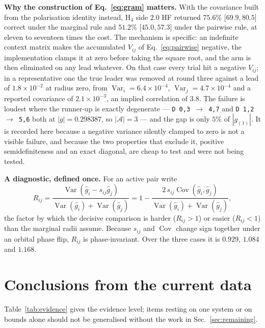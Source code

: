 \documentclass[10pt]{article}
\newcommand{\Var}{\operatorname{Var}}
\newcommand{\Cov}{\operatorname{Cov}}
\begin{document}
\textbf{Why the construction of Eq.~\eqref{eq:gram} matters.} With the covariance
built from the polarisation identity instead, H$_4$ side $2.0$ HF returned
$75.6\%$ [$69.9,80.5$] correct under the marginal rule and $51.2\%$ [$45.0,57.3$]
under the pairwise rule, at eleven to seventeen times the cost. The mechanism is
specific: an indefinite context matrix makes the accumulated $V_{ij}$ of
Eq.~\eqref{eq:pairwise} negative, the implementation clamps it at zero before
taking the square root, and the arm is then eliminated on any lead whatever. On
that case every trial hit a negative $V_{ij}$; in a representative one the true
leader was removed at round three against a lead of $1.8\times10^{-2}$ at radius
zero, from $\Var_i=6.4\times10^{-4}$, $\Var_j=4.7\times10^{-4}$ and a reported
covariance of $2.1\times10^{-3}$, an implied correlation of $3.8$. The failure is
loudest where the runner-up is exactly degenerate --- \texttt{D 0,3 $\to$ 4,7} and
\texttt{D 1,2 $\to$ 5,6} both at $|g|=0.298387$, so $|\mathcal A|=3$ --- and the
gap is only $5\%$ of $|g_{(1)}|$. It is recorded here because a negative variance
silently clamped to zero is not a visible failure, and because the two properties
that exclude it, positive semidefiniteness and an exact diagonal, are cheap to
test and were not being tested.

\textbf{A diagnostic, defined once.} For an active pair write
\begin{equation}
  R_{ij}=\frac{\Var\!\left(\widehat g_i-s_{ij}\widehat g_j\right)}
              {\Var(\widehat g_i)+\Var(\widehat g_j)}
        =1-\frac{2\,s_{ij}\Cov(\widehat g_i,\widehat g_j)}
                {\Var(\widehat g_i)+\Var(\widehat g_j)} ,
  \label{eq:Rij}
\end{equation}
the factor by which the decisive comparison is harder ($R_{ij}>1$) or easier
($R_{ij}<1$) than the marginal radii assume. Because $s_{ij}$ and
$\Cov$ change sign together under an orbital phase flip, $R_{ij}$ is
phase-invariant. Over the three cases it is $0.929$, $1.084$ and $1.168$.

\section{Conclusions from the current data}
\label{sec:conclusions}

Table~\ref{tab:evidence} gives the evidence level; items resting on one system or
on bounds alone should not be generalised without the work in
Sec.~\ref{sec:remaining}.
\end{document}
